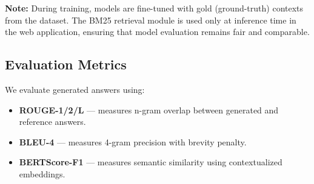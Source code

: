 \noindent\textbf{Note:} During training, models are fine-tuned with gold (ground-truth) contexts from the dataset. The BM25 retrieval module is used only at inference time in the web application, ensuring that model evaluation remains fair and comparable.

\subsection{Evaluation Metrics}
We evaluate generated answers using:
\begin{itemize}
  \item \textbf{ROUGE-1/2/L} — measures n-gram overlap between generated and reference answers.
  \item \textbf{BLEU-4} — measures 4-gram precision with brevity penalty.
  \item \textbf{BERTScore-F1} — measures semantic similarity using contextualized embeddings.
\end{itemize}
